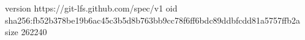 version https://git-lfs.github.com/spec/v1
oid sha256:fb52b378be19b6ac45c3b5d8b763bb9cc78f6ff6bdc89ddbfcdd81a5757ffb2a
size 262240
